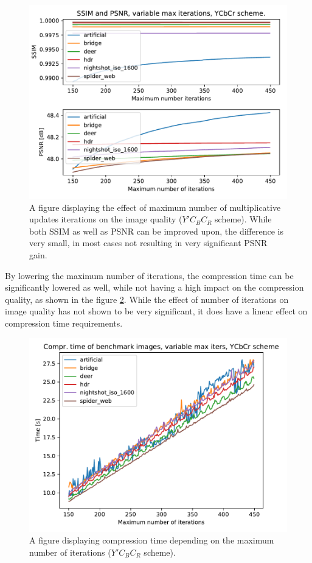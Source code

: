 \documentclass[thesis=M,english]{FITthesis}[2012/10/20]
\begin{document}
\begin{figure}
  \centering
  \includegraphics[scale=0.8]{imgs/results/psnr_ssim_maxiter_ycbcr}
  \caption[Effect of multiplicative update iterations on image quality ($Y'C_BC_R$)]{A figure displaying the effect of maximum number of multiplicative updates
           iterations on the image quality ($Y'C_BC_R$ scheme). While both SSIM as well as PSNR can be
           improved upon, the difference is very small, in most cases not resulting in
           very significant PSNR gain.}
  \label{fig:maxiter_ycbcr}
\end{figure}

By lowering the maximum number of iterations, the compression time can be significantly lowered as well,
while not having a high impact on the compression quality, as shown in the figure \ref{fig:maxiter_ycbcr_comprtime}.
While the effect of number of iterations on image quality has not shown to be very significant,
it does have a linear effect on compression time requirements.

\begin{figure}
  \centering
  \includegraphics[scale=0.8]{imgs/results/maxiter_ycbcr_comprtime}
  \caption[Compression time depending on maximum iterations ($Y'C_BC_R$)]{A figure displaying compression time depending on the maximum number of iterations ($Y'C_BC_R$ scheme).}
  \label{fig:maxiter_ycbcr_comprtime}
\end{figure}
\end{document}
